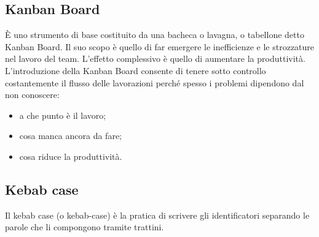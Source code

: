 \documentclass[../glossario.tex]{subfiles}
\begin{document}
\subsection*{Kanban Board}
{}
È uno strumento di base costituito da una bacheca o lavagna, o tabellone detto Kanban Board. Il suo scopo è quello di far emergere le inefficienze e le strozzature nel lavoro del team. L’effetto complessivo è quello di aumentare la produttività. L’introduzione della Kanban Board consente di tenere sotto controllo costantemente il flusso delle lavorazioni perché spesso i problemi dipendono dal non conoscere:
\begin{itemize}
\item a che punto è il lavoro;
\item cosa manca ancora da fare;
\item cosa riduce la produttività.
\end{itemize}

\subsection*{Kebab case }
{}
Il kebab case (o kebab-case) è la pratica di scrivere gli identificatori separando le parole che li compongono tramite trattini.
\end{document}
